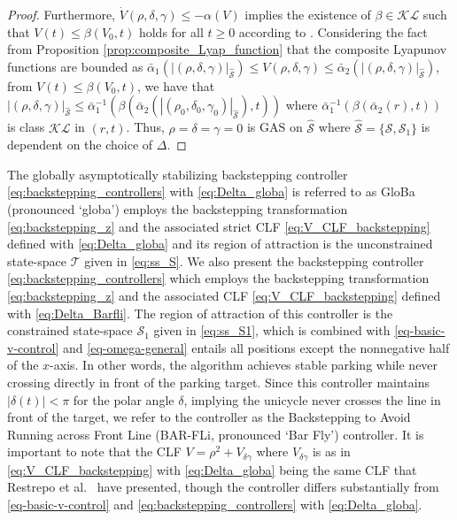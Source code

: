 \documentclass[letterpaper, 10 pt, conference]{ieeeconf}  %
\newcommand{\abs}[1]{\left\lvert#1\right\rvert}
\begin{document}
\begin{proof}
Furthermore, $\dot{V}(\rho,\delta,\gamma) \le - \alpha(V)$ implies the existence of  $\beta\in\mathcal{KL}$  such that
$V(t) \le \beta(V_0, t)$  
holds for all $t\geq 0$ according to \cite[Lemma 4.4]{khalil_nonlinear_2002}. Considering the fact from Proposition \ref{prop:composite_Lyap_function} that the composite Lyapunov functions are bounded as $ \bar\alpha_1(|(\rho,\delta, \gamma)|_{\hat{\mathcal{S}}}) \le V(\rho,\delta,\gamma) \le \bar\alpha_2(|(\rho,\delta, \gamma)|_{\hat{\mathcal{S}}})$, from  $V(t) \le \beta(V_0, t)$, we have that     
$\abs{(\rho,\delta,\gamma)}_{\hat{\mathcal{S}}} \le \bar{\alpha}_1^{-1}(\beta( \bar{\alpha}_2(\abs{(\rho_0, \delta_0,\gamma_0)}_{\hat{\mathcal{S}}}),t))$
where $\bar{\alpha}_1^{-1}(\beta( \bar{\alpha}_2(r),t))$ is class $\mathcal{KL}$ in $(r,t)$.
Thus, 
$\rho =  \delta = \gamma = 0$ is GAS on $\hat{\mathcal{S}}$ where $\hat{\mathcal{S}} = \{\mathcal{S}, \mathcal{S}_1\}$ is dependent on the choice of $\Delta$.
\end{proof}

The globally asymptotically stabilizing backstepping controller \eqref{eq:backstepping_controllers} with \eqref{eq:Delta_globa} is referred to as GloBa (pronounced `globa') 
employs the backstepping transformation \eqref{eq:backstepping_z} and the associated strict CLF \eqref{eq:V_CLF_backstepping} defined with \eqref{eq:Delta_globa} and its region of attraction is the unconstrained state-space  $\mathcal{T}$ given in \eqref{eq:ss_S}.
 We also present the backstepping controller \eqref{eq:backstepping_controllers}
which employs the backstepping transformation \eqref{eq:backstepping_z} and the associated CLF \eqref{eq:V_CLF_backstepping} defined with \eqref{eq:Delta_Barfli}.
The region of attraction of this controller is the constrained state-space $\mathcal{S}_1$ given in \eqref{eq:ss_S1}, which is combined with \eqref{eq-basic-v-control} and \eqref{eq-omega-general}
entails all positions except the nonnegative half of the $x$-axis. In other words, the algorithm achieves stable parking while never crossing directly in front of the parking target. Since this controller maintains $|\delta(t)|<\pi$ for the polar angle $\delta$, implying the unicycle never crosses the line in front of the target, we refer to the controller as the Backstepping to Avoid Running across Front Line (BAR-FLi, pronounced `Bar Fly') controller.
It is important to note that the CLF %
$V = \rho^2 + V_{\delta\gamma}$ where $V_{\delta \gamma}$ is as in \eqref{eq:V_CLF_backstepping} with \eqref{eq:Delta_globa} being the same CLF that Restrepo et al.~\cite{restrepo2020leader} have presented, though the controller differs substantially from \eqref{eq-basic-v-control} and \eqref{eq:backstepping_controllers} with \eqref{eq:Delta_globa}.
\end{document}
